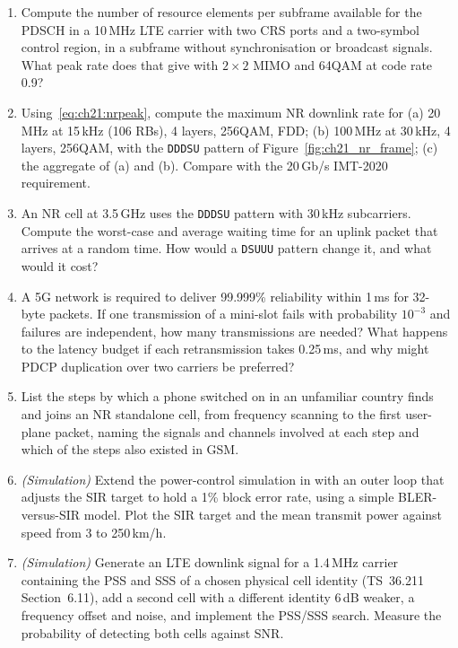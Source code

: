 \begin{enumerate}[label=\thechapter.\arabic*]
\item Compute the number of resource elements per subframe available for the PDSCH in a 10\,MHz LTE
carrier with two CRS ports and a two-symbol control region, in a subframe without synchronisation or
broadcast signals. What peak rate does that give with $2\times2$ MIMO and 64QAM at code rate 0.9?
\item Using~\eqref{eq:ch21:nrpeak}, compute the maximum NR downlink rate for (a) 20\,MHz at 15\,kHz
(106 RBs), 4 layers, 256QAM, FDD; (b) 100\,MHz at 30\,kHz, 4 layers, 256QAM, with the \texttt{DDDSU}
pattern of Figure~\ref{fig:ch21_nr_frame}; (c) the aggregate of (a) and (b). Compare with the
20\,Gb/s IMT-2020 requirement.
\item An NR cell at 3.5\,GHz uses the \texttt{DDDSU} pattern with 30\,kHz subcarriers. Compute the
worst-case and average waiting time for an uplink packet that arrives at a random time. How would a
\texttt{DSUUU} pattern change it, and what would it cost?
\item A 5G network is required to deliver 99.999\% reliability within 1\,ms for 32-byte packets. If
one transmission of a mini-slot fails with probability $10^{-3}$ and failures are independent, how
many transmissions are needed? What happens to the latency budget if each retransmission takes
0.25\,ms, and why might PDCP duplication over two carriers be preferred?
\item List the steps by which a phone switched on in an unfamiliar country finds and joins an NR
standalone cell, from frequency scanning to the first user-plane packet, naming the signals and
channels involved at each step and which of the steps also existed in GSM.
\item \emph{(Simulation)} Extend the power-control simulation in 
with an outer loop that adjusts the SIR target to hold a 1\% block error rate, using a simple
BLER-versus-SIR model. Plot the SIR target and the mean transmit power against speed from 3 to
250\,km/h.
\item \emph{(Simulation)} Generate an LTE downlink signal for a 1.4\,MHz carrier containing the PSS
and SSS of a chosen physical cell identity (TS~36.211 Section~6.11), add a second cell with a
different identity 6\,dB weaker, a frequency offset and noise, and implement the PSS/SSS search.
Measure the probability of detecting both cells against SNR.
\end{enumerate}

